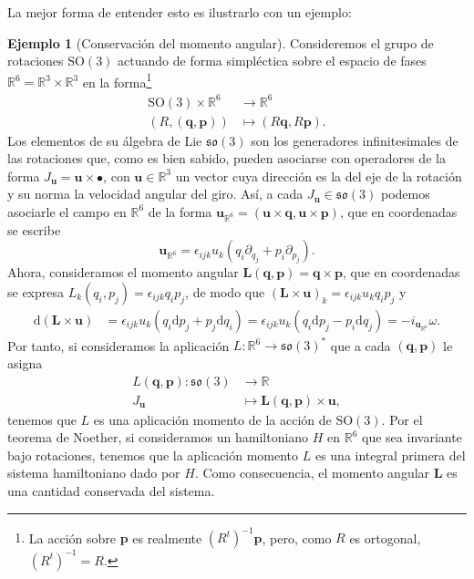 \documentclass[11pt,a4paper,twoside]{article}
\theoremstyle{definition} \newtheorem{defn}[thm]{Definición}
\theoremstyle{definition} \newtheorem{ejemplo}[thm]{Ejemplo}
\theoremstyle{definition} \newtheorem{ejercicio}[thm]{Ejercicio}
\theoremstyle{remark} \newtheorem*{obs}{Observación}
\def\RR{\mathbb{R}}
\def\dd{\mathrm{d}}
\newcommand{\vect}[1]{\mathbf{#1}}
\begin{document}
  La mejor forma de entender esto es ilustrarlo con un ejemplo:
  \begin{ejemplo}[Conservación del momento angular]
    Consideremos el grupo de rotaciones $\mathrm{SO}(3)$ actuando de forma simpléctica sobre el espacio de fases $\RR^6=\RR^3\times \RR^3$ en la forma\footnote{La acción sobre $\vect{p}$ es realmente $(R^t)^{-1}\vect{p}$, pero, como $R$ es ortogonal, $(R^t)^{-1}=R$.}
    \begin{align*}
      \mathrm{SO}(3)\times \RR^6&\longrightarrow \RR^6\\ 
      (R,(\vect{q},\vect{p})) &\longmapsto (R\vect{q},R\vect{p}) .
      \end{align*} 
      Los elementos de su álgebra de Lie $\mathfrak{so}(3)$ son los generadores infinitesimales de las rotaciones que, como es bien sabido, pueden asociarse con operadores de la forma $J_{\vect{u}}=\vect{u}\times \bullet$, con $\vect{u}\in \RR^3$ un vector cuya dirección es la del eje de la rotación y su norma la velocidad angular del giro. Así, a cada $J_{\vect{u}}\in \mathfrak{so}(3)$ podemos asociarle el campo en $\RR^6$ de la forma $\vect{u}_{\RR^6}=(\vect{u}\times \vect{q}, \vect{u}\times \vect{p})$, que en coordenadas se escribe
      \begin{equation*}
	\vect{u}_{\RR^6}=\epsilon_{ijk}u_k(q_i \partial_{q_j}+p_i \partial_{p_j}).
      \end{equation*}
      Ahora, consideramos el momento angular $\vect{L}(\vect{q},\vect{p})=\vect{q}\times \vect{p}$, que en coordenadas se expresa $L_k(q_i,p_j)=\epsilon_{ijk}q_ip_j$, de modo que $(\vect{L}\times\vect{u})_{k}=\epsilon_{ijk}u_kq_ip_j$ y 
      \begin{align*}
	\dd(\vect{L}\times \vect{u})&=\epsilon_{ijk}u_k(q_i\dd p_j + p_j\dd q_i)=\epsilon_{ijk}u_k(q_i\dd p_j - p_i\dd q_j)=-i_{\vect{u}_{\RR^6}}\omega.
      \end{align*}
      Por tanto, si consideramos la aplicación $L:\RR^6\rightarrow\mathfrak{so}(3)^*$ que a cada $(\vect{q},\vect{p})$ le asigna  
      \begin{align*}
	L(\vect{q},\vect{p}) :\mathfrak{so}(3)&\longrightarrow \RR\\ 
	J_\vect{u} &\longmapsto \vect{L}(\vect{q},\vect{p})\times \vect{u},
	\end{align*}
	tenemos que $L$ es una aplicación momento de la acción de $\mathrm{SO}(3)$. Por el teorema de Noether, si consideramos un hamiltoniano $H$ en $\RR^6$ que sea invariante bajo rotaciones, tenemos que la aplicación momento $L$ es una integral primera del sistema hamiltoniano dado por $H$. Como consecuencia, el momento angular $\vect{L}$ es una cantidad conservada del sistema.
  \end{ejemplo}
\end{document}

